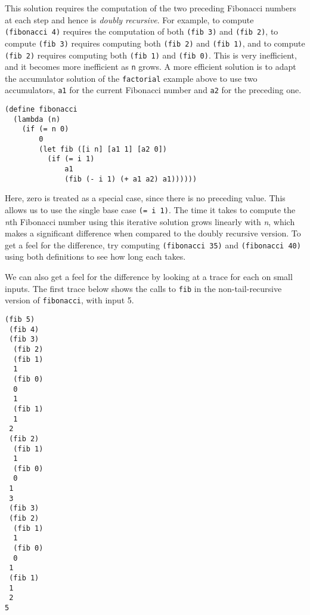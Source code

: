 This solution requires the computation of the two preceding Fibonacci
numbers at each step and hence is \label{further_s49}\textit{doubly recursive}.
For example, to compute \texttt{(fibonacci 4)} requires the computation of both
\texttt{(fib 3)} and \texttt{(fib 2)}, to compute \texttt{(fib 3)} requires computing
both \texttt{(fib 2)} and \texttt{(fib 1)}, and to compute \texttt{(fib 2)} requires
computing both \texttt{(fib 1)} and \texttt{(fib 0)}.
This is very inefficient, and it becomes more inefficient as \texttt{n} grows.
A more efficient solution is to adapt the accumulator solution of the
\texttt{factorial} example above to use two accumulators, \texttt{a1} for the
current Fibonacci number and \texttt{a2} for the preceding one.


\begin{alltt}
(define fibonacci
  (lambda (n)
    (if (= n 0)
        0
        (let fib ([i n] [a1 1] [a2 0])
          (if (= i 1)
              a1
              (fib (- i 1) (+ a1 a2) a1))))))
\end{alltt}


Here, zero is treated as a special case, since there is no preceding value.
This allows us to use the single base case \texttt{(= i 1)}.
The time it takes to compute the \textit{n}th Fibonacci number using this
iterative solution grows linearly with \textit{n}, which makes a
significant difference when compared to the doubly recursive version.
To get a feel for the difference, try computing \texttt{(fibonacci 35)} and
\texttt{(fibonacci 40)} using
both definitions to see how long each takes.


We can also get a feel for the difference by looking at a trace for
each on small inputs.
The first trace below shows the calls to \texttt{fib} in the non-tail-recursive
version of \texttt{fibonacci}, with input 5.


\begin{alltt}
\textbar{}(fib 5)
\textbar{} (fib 4)
\textbar{} \textbar{}(fib 3)
\textbar{} \textbar{} (fib 2)
\textbar{} \textbar{} \textbar{}(fib 1)
\textbar{} \textbar{} \textbar{}1
\textbar{} \textbar{} \textbar{}(fib 0)
\textbar{} \textbar{} \textbar{}0
\textbar{} \textbar{} 1
\textbar{} \textbar{} (fib 1)
\textbar{} \textbar{} 1
\textbar{} \textbar{}2
\textbar{} \textbar{}(fib 2)
\textbar{} \textbar{} (fib 1)
\textbar{} \textbar{} 1
\textbar{} \textbar{} (fib 0)
\textbar{} \textbar{} 0
\textbar{} \textbar{}1
\textbar{} 3
\textbar{} (fib 3)
\textbar{} \textbar{}(fib 2)
\textbar{} \textbar{} (fib 1)
\textbar{} \textbar{} 1
\textbar{} \textbar{} (fib 0)
\textbar{} \textbar{} 0
\textbar{} \textbar{}1
\textbar{} \textbar{}(fib 1)
\textbar{} \textbar{}1
\textbar{} 2
\textbar{}5
\end{alltt}


